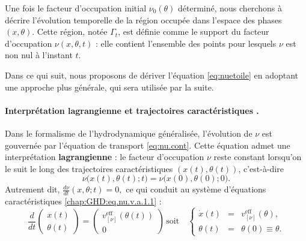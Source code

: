 Une fois le facteur d’occupation initial $\nu_0(\theta)$ déterminé, nous cherchons à décrire l’évolution temporelle de la région occupée dans l’espace des phases $(x,\theta)$. Cette région, notée $\Gamma_t$, est définie comme le support du facteur d’occupation $\nu(x,\theta,t)$ : elle contient l’ensemble des points pour lesquels $\nu$ est non nul à l’instant $t$.

\medskip


Dans ce qui suit, nous proposons de dériver l'équation \eqref{eq:nuetoile} en adoptant une approche plus générale, qui sera utilisée par la suite.

\paragraph{Interprétation lagrangienne et trajectoires caractéristiques .}
Dans le formalisme de l’hydrodynamique généralisée, l’évolution de $\nu$ est gouvernée par l'équation de transport  \eqref{eq:nu.cont}.  
Cette équation admet une interprétation \textbf{lagrangienne} : le facteur d’occupation $\nu$ reste constant lorsqu’on le suit le long des trajectoires caractéristiques $(x(t),\theta(t))$, c’est-à-dire
\begin{equation}\label{chap6:eq:traj_lagr_0}
\nu\big(x(t),\theta(t);t\big) = \nu\big(x(0),\theta(0);0\big).
\end{equation}
Autrement dit,
\(
\frac{d\nu}{dt}(x,\theta;t) = 0,
\)
ce qui conduit au système d’équations caractéristiques \eqref{chap:GHD:eq.nu.v.a.1.1} :
\begin{equation}
\label{chap6:eq:traj_lagr_1}
\frac{d}{dt} \left( \begin{array}{c} x(t) \\ \theta(t) \end{array} \right)  =  \left( \begin{array}{c} v^{\mathrm{eff}}_{[\nu]}(\theta(t)) \\ 0 \end{array} \right)\, \mbox{soit} \quad \left\{ \begin{array}{rcl}
\displaystyle \dot x (t) & = & v^{\mathrm{eff}}_{[\nu]}(\theta), \\
\theta(t) & = & \theta(0) \equiv \theta.
\end{array} \right. 
\end{equation}

